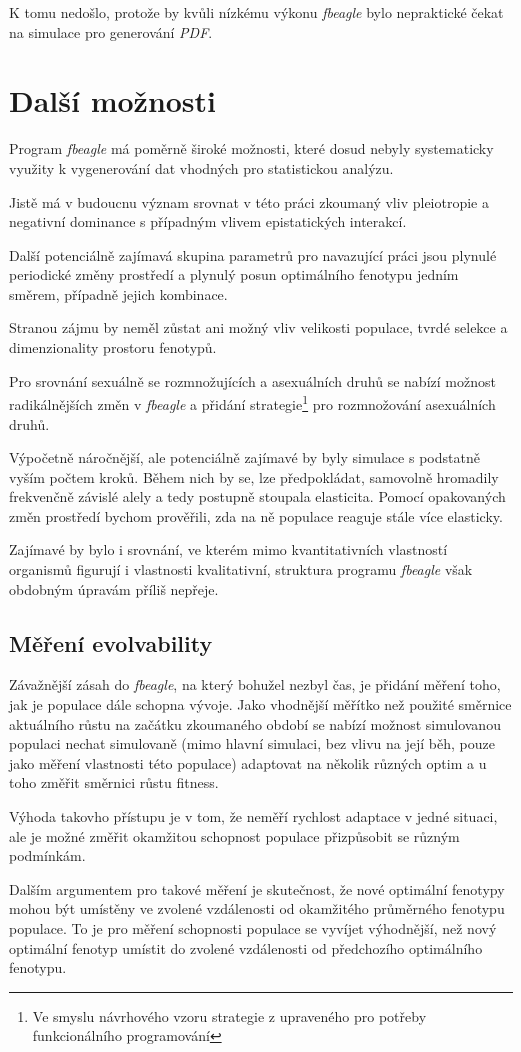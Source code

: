 K tomu nedošlo, protože by kvůli nízkému výkonu \textit{fbeagle} bylo nepraktické čekat na simulace pro generování
\textit{PDF}.


\section{Další možnosti}

Program \textit{fbeagle} má poměrně široké možnosti, které dosud nebyly systematicky využity k
vygenerování dat vhodných pro statistickou analýzu.

Jistě má v budoucnu význam srovnat v této práci zkoumaný vliv pleiotropie a negativní dominance s případným vlivem
epistatických interakcí.

Další potenciálně zajímavá skupina parametrů pro navazující práci jsou plynulé periodické změny prostředí
a plynulý posun optimálního fenotypu jedním směrem, případně jejich kombinace.

Stranou zájmu by neměl zůstat ani možný vliv velikosti populace, tvrdé selekce a dimenzionality prostoru fenotypů.

Pro srovnání sexuálně se rozmnožujících a asexuálních druhů se nabízí možnost radikálnějších změn v \textit{fbeagle}
a přidání strategie\footnote{Ve smyslu návrhového vzoru strategie z \citet{GammaHelmEtAl95} upraveného pro potřeby
funkcionálního programování} pro rozmnožování asexuálních druhů.

Výpočetně náročnější, ale potenciálně zajímavé by byly simulace s podstatně vyším počtem kroků. Během nich by se, lze
předpokládat, samovolně hromadily frekvenčně závislé alely a tedy postupně stoupala elasticita.
Pomocí opakovaných změn prostředí bychom prověřili, zda na ně populace reaguje stále více elasticky.

Zajímavé by bylo i srovnání, ve kterém mimo kvantitativních vlastností organismů figurují i vlastnosti kvalitativní,
struktura programu \textit{fbeagle} však obdobným úpravám příliš nepřeje.

\subsection{Měření evolvability}

Závažnější zásah do \textit{fbeagle}, na který bohužel nezbyl čas, je přidání měření toho, jak je populace
dále schopna vývoje. Jako vhodnější měřítko než použité směrnice aktuálního růstu na začátku zkoumaného období
se nabízí možnost simulovanou populaci nechat simulovaně (mimo hlavní simulaci, bez vlivu na její běh,
pouze jako měření vlastnosti této populace) adaptovat na několik různých optim a u toho změřit směrnici
růstu fitness.

Výhoda takovho přístupu je v tom, že neměří rychlost adaptace v jedné situaci, ale je možné změřit okamžitou schopnost
populace přizpůsobit se různým podmínkám.

Dalším argumentem pro takové měření je skutečnost, že nové optimální fenotypy mohou být umístěny ve zvolené vzdálenosti
od okamžitého průměrného fenotypu populace. To je pro měření schopnosti populace se vyvíjet výhodnější, než nový
optimální fenotyp umístit do zvolené vzdálenosti od předchozího optimálního fenotypu.
